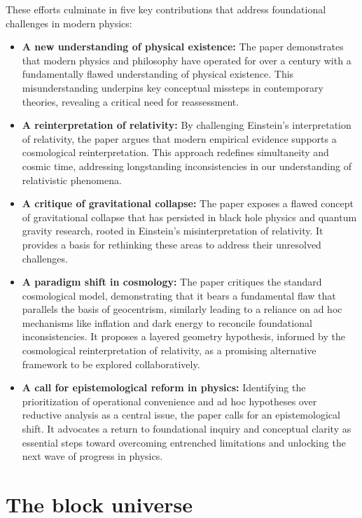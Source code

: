 \documentclass[aps,rmp,groupedaddress,twocolumn,10pt]{revtex4-2}
\begin{document}
These efforts culminate in five key contributions that address foundational challenges in modern physics: 
\begin{itemize}
    \item \textbf{A new understanding of physical existence:} The paper demonstrates that modern physics and philosophy have operated for over a century with a fundamentally flawed understanding of physical existence. This misunderstanding underpins key conceptual missteps in contemporary theories, revealing a critical need for reassessment.
    \item \textbf{A reinterpretation of relativity:} By challenging Einstein’s interpretation of relativity, the paper argues that modern empirical evidence supports a cosmological reinterpretation. This approach redefines simultaneity and cosmic time, addressing longstanding inconsistencies in our understanding of relativistic phenomena.
    \item \textbf{A critique of gravitational collapse:} The paper exposes a flawed concept of gravitational collapse that has persisted in black hole physics and quantum gravity research, rooted in Einstein’s misinterpretation of relativity. It provides a basis for rethinking these areas to address their unresolved challenges.
    \item \textbf{A paradigm shift in cosmology:} The paper critiques the standard cosmological model, demonstrating that it bears a fundamental flaw that parallels the basis of geocentrism, similarly leading to a reliance on ad hoc mechanisms like inflation and dark energy to reconcile foundational inconsistencies. It proposes a layered geometry hypothesis, informed by the cosmological reinterpretation of relativity, as a promising alternative framework to be explored collaboratively.
    \item \textbf{A call for epistemological reform in physics:} Identifying the prioritization of operational convenience and ad hoc hypotheses over reductive analysis as a central issue, the paper calls for an epistemological shift. It advocates a return to foundational inquiry and conceptual clarity as essential steps toward overcoming entrenched limitations and unlocking the next wave of progress in physics.
\end{itemize}

\section{The block universe}\label{sec:block}
\end{document}
